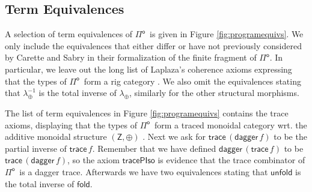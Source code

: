 \documentclass[runningheads,a4paper]{llncs}
\newcommand{\Pio}{\ensuremath{\mathsf{\Pi}^{\mathsf{o}}}}
\newcommand{\lr}{\longleftrightarrow}
\newcommand{\fold}{\mathsf{fold}}
\newcommand{\unfold}{\mathsf{unfold}}
\newcommand{\sub}{\mathsf{sub}}
\newcommand{\trace}{\ensuremath{\mathsf{trace}}}
\newcommand{\Z}{\mathsf{Z}}
\newcommand{\I}{\mathsf{I}}
\renewcommand{\dagger}{\mathsf{dagger}}
\begin{document}

\subsection{Term Equivalences}

A selection of term equivalences of \Pio\ is given in Figure
\ref{fig:programequivs}. We only include the equivalences that either
differ or have not previously considered by Carette and Sabry in their
formalization of the finite fragment of \Pio \cite{CaretteS16}. In
particular, we leave out the long list of Laplaza's coherence axioms
expressing that the types of \Pio\ form a rig category \cite{Laplaza}.
We also omit the equivalences stating that $\lambda_\oplus^{-1}$ is
the total inverse of $\lambda_\oplus$, similarly for the other
structural morphisms. 

The list of term equivalences in Figure \ref{fig:programequivs}
contains the trace axioms, displaying that the types of \Pio\ form a
traced monoidal category wrt. the additive monoidal structure
$(\Z,\oplus)$ \cite{Karvonen19}. Next we ask for
$\trace\,(\dagger\,f)$ to be the partial inverse of
$\trace\,f$. Remember that we have defined $\dagger\,(\trace\,f)$ to
be $\trace\,(\dagger \,f)$, so the axiom $\mathsf{tracePIso}$
is evidence that the trace combinator of \Pio\ is a dagger trace.
Afterwards we have two equivalences stating that $\unfold$ is the
total inverse of $\fold$. 
\end{document}
